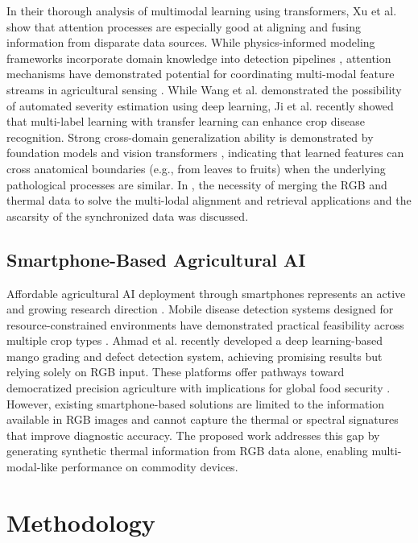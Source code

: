 \documentclass[utf8]{FrontiersinHarvard} %
\begin{document}
In their thorough analysis of multimodal learning using transformers, Xu et al. \cite{xu2023} show that attention processes are especially good at aligning and fusing information from disparate data sources. While physics-informed modeling frameworks incorporate domain knowledge into detection pipelines \cite{karniadakis2021}, attention mechanisms have demonstrated potential for coordinating multi-modal feature streams in agricultural sensing \cite{niu2021,guo2022}. While Wang et al. \cite{wang2022_synthetic} demonstrated the possibility of automated severity estimation using deep learning, Ji et al. \cite{ji2023} recently showed that multi-label learning with transfer learning can enhance crop disease recognition. Strong cross-domain generalization ability is demonstrated by foundation models and vision transformers \cite{vaswani2017,dosovitskiy2021}, indicating that learned features can cross anatomical boundaries (e.g., from leaves to fruits) when the underlying pathological processes are similar. In \cite{xiao2025thermalgen,tulu2026rgb}, the necessity of merging the RGB and thermal data to solve the multi-lodal alignment and retrieval applications and the ascarsity of the synchronized data was discussed.

\subsection{Smartphone-Based Agricultural AI}
Affordable agricultural AI deployment through smartphones represents an active and growing research direction \cite{pongnumkul2015,coulibaly2022}. Mobile disease detection systems designed for resource-constrained environments have demonstrated practical feasibility across multiple crop types \cite{li2020,picon2022}. Ahmad et al. \cite{ahmad2023} recently developed a deep learning-based mango grading and defect detection system, achieving promising results but relying solely on RGB input. These platforms offer pathways toward democratized precision agriculture with implications for global food security \cite{liu2020_yolo}. However, existing smartphone-based solutions are limited to the information available in RGB images and cannot capture the thermal or spectral signatures that improve diagnostic accuracy. The proposed work addresses this gap by generating synthetic thermal information from RGB data alone, enabling multi-modal-like performance on commodity devices.

\section{Methodology}
\end{document}
